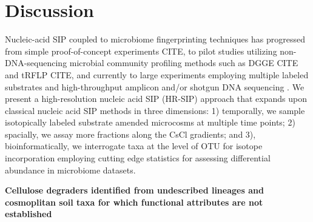 \section{Discussion}
Nucleic-acid SIP coupled to microbiome fingerprinting techniques has progressed
from simple proof-of-concept experiments  CITE, to pilot studies utilizing
non-DNA-sequencing microbial community profiling methods such as DGGE CITE and
tRFLP CITE, and currently to large experiments employing multiple labeled
substrates and high-throughput amplicon and/or shotgun DNA sequencing
\citep{Verastegui_2014}. We present a high-resolution nucleic acid SIP (HR-SIP)
approach that expands upon classical nucleic acid SIP methods in three
dimensions: 1) temporally, we sample isotopically labeled substrate amended
microcosms at multiple time points; 2) spacially, we assay more fractions along
the CsCl gradients; and 3), bioinformatically, we interrogate taxa at the level
of OTU for isotope incorporation employing cutting edge statistics for
assessing differential abundance in microbiome datasets.

\textbf{Cellulose degraders identified from undescribed lineages and
cosmoplitan soil taxa for which functional attributes are not established}

